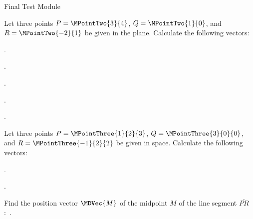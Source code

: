 \begin{MTest}{Final Test Module }
\begin{MExercise}
Let three points $P=\MPointTwo{3}{4}$, $Q=\MPointTwo{1}{0}$, and $R=\MPointTwo{-2}{1}$ 
be given in the plane. Calculate the following vectors:
\begin{MExerciseItems}
\item{.}
\item{.}
\item{.}
\item{.}
\item{.}
\end{MExerciseItems}
\end{MExercise}


\begin{MExercise}
Let three points $P=\MPointThree{1}{2}{3}$, $Q=\MPointThree{3}{0}{0}$, and $R=\MPointThree{-1}{2}{2}$ be given 
in space. Calculate the following vectors:
\begin{MExerciseItems}
\item{.}
\item{.}
\end{MExerciseItems}

Find the position vector $\MDVec{M}$ of the midpoint $M$ of the line segment $\overline{P R}$:\ 
.
\end{MExercise}

\begin{MExercise}


\end{MExercise}
\end{MTest}
